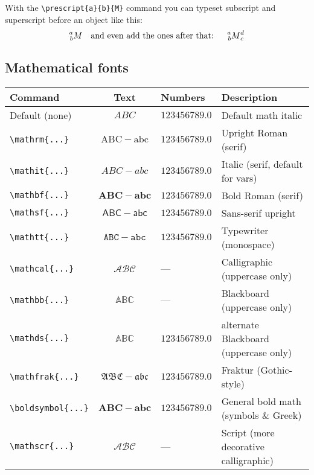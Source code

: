     With the \verb|\prescript{a}{b}{M}| command you can typeset subscript and superscript before an object like this:
    \[  \prescript{a}{b}{M}
        \text{\quad and even add the ones after that: \quad}
        \prescript{a}{b}{M}_c^d \]

\subsection{Mathematical fonts}

\begin{center}
    \small
    \begin{tabular}{l cl l}
        \toprule
        \textbf{Command}        & \textbf{Text}          & \textbf{Numbers}           & \textbf{Description}                     \\ \midrule
        Default (none)          & $ABC$                  & $123456789.0$              & Default math italic                      \\
        \verb|\mathrm{...}|     & $\mathrm{ABC-abc}$     & $\mathrm{123456789.0}$     & Upright Roman (serif)                    \\
        \verb|\mathit{...}|     & $\mathit{ABC-abc}$     & $\mathit{123456789.0}$     & Italic (serif, default for vars)         \\
        \verb|\mathbf{...}|     & $\mathbf{ABC-abc}$     & $\mathbf{123456789.0}$     & Bold Roman (serif)                       \\
        \verb|\mathsf{...}|     & $\mathsf{ABC-abc}$     & $\mathsf{123456789.0}$     & Sans-serif upright                       \\
        \verb|\mathtt{...}|     & $\mathtt{ABC-abc}$     & $\mathtt{123456789.0}$     & Typewriter (monospace)                   \\
        \verb|\mathcal{...}|    & $\mathcal{ABC}$        & ---                        & Calligraphic (uppercase only)            \\
        \verb|\mathbb{...}|     & $\mathbb{ABC}$         & ---                        & Blackboard (uppercase only)              \\
        \verb|\mathds{...}|     & $\mathds{ABC}$         & $\mathds{123456789.0}$     & alternate Blackboard (uppercase only)    \\
        \verb|\mathfrak{...}|   & $\mathfrak{ABC-abc}$   & $\mathfrak{123456789.0}$   & Fraktur (Gothic-style)                   \\
        \verb|\boldsymbol{...}| & $\boldsymbol{ABC-abc}$ & $\boldsymbol{123456789.0}$ & General bold math (symbols \& Greek) \\
        \verb|\mathscr{...}|    & $\mathscr{ABC}$        & ---                        & Script (more decorative calligraphic)    \\ \bottomrule
    \end{tabular}
\end{center}

